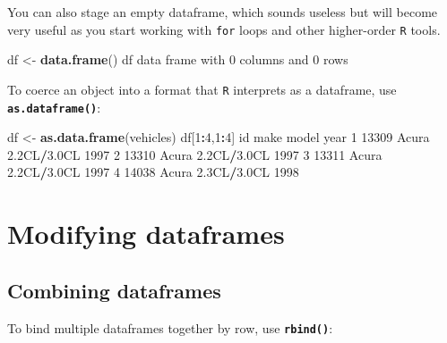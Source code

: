 \documentclass[
]{book}
\newenvironment{Shaded}{\begin{snugshade}}{\end{snugshade}}
\newcommand{\DecValTok}[1]{\textcolor[rgb]{0.00,0.00,0.81}{#1}}
\newcommand{\FloatTok}[1]{\textcolor[rgb]{0.00,0.00,0.81}{#1}}
\newcommand{\FunctionTok}[1]{\textcolor[rgb]{0.13,0.29,0.53}{\textbf{#1}}}
\newcommand{\NormalTok}[1]{#1}
\newcommand{\OtherTok}[1]{\textcolor[rgb]{0.56,0.35,0.01}{#1}}
\newcommand{\SpecialCharTok}[1]{\textcolor[rgb]{0.81,0.36,0.00}{\textbf{#1}}}
\begin{document}
You can also stage an empty dataframe, which sounds useless but will become very useful as you start working with \texttt{for} loops and other higher-order \texttt{R} tools.

\begin{Shaded}
\begin{Highlighting}[]
\NormalTok{df }\OtherTok{\textless{}{-}} \FunctionTok{data.frame}\NormalTok{()}
\NormalTok{df}
\NormalTok{data frame with }\DecValTok{0}\NormalTok{ columns and }\DecValTok{0}\NormalTok{ rows}
\end{Highlighting}
\end{Shaded}

To coerce an object into a format that \texttt{R} interprets as a dataframe, use \textbf{\texttt{as.dataframe()}}:

\begin{Shaded}
\begin{Highlighting}[]
\NormalTok{df }\OtherTok{\textless{}{-}} \FunctionTok{as.data.frame}\NormalTok{(vehicles)}
\NormalTok{df[}\DecValTok{1}\SpecialCharTok{:}\DecValTok{4}\NormalTok{,}\DecValTok{1}\SpecialCharTok{:}\DecValTok{4}\NormalTok{]}
\NormalTok{     id  make       model year}
\DecValTok{1} \DecValTok{13309}\NormalTok{ Acura }\FloatTok{2.2}\NormalTok{CL}\SpecialCharTok{/}\FloatTok{3.0}\NormalTok{CL }\DecValTok{1997}
\DecValTok{2} \DecValTok{13310}\NormalTok{ Acura }\FloatTok{2.2}\NormalTok{CL}\SpecialCharTok{/}\FloatTok{3.0}\NormalTok{CL }\DecValTok{1997}
\DecValTok{3} \DecValTok{13311}\NormalTok{ Acura }\FloatTok{2.2}\NormalTok{CL}\SpecialCharTok{/}\FloatTok{3.0}\NormalTok{CL }\DecValTok{1997}
\DecValTok{4} \DecValTok{14038}\NormalTok{ Acura }\FloatTok{2.3}\NormalTok{CL}\SpecialCharTok{/}\FloatTok{3.0}\NormalTok{CL }\DecValTok{1998}
\end{Highlighting}
\end{Shaded}

\section*{Modifying dataframes}\label{modifying-dataframes}

\subsection*{Combining dataframes}\label{combining-dataframes}

To bind multiple dataframes together by row, use \textbf{\texttt{rbind()}}:
\end{document}
